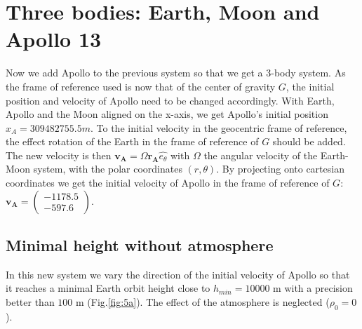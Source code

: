 \documentclass[a4paper,12pt,twoside]{article}
\begin{document}
\section{Three bodies: Earth, Moon and Apollo 13}
Now we add Apollo to the previous system so that we get a 3-body system. As the frame of reference used is now that of the center of gravity $G$, the initial position and velocity of Apollo need to be changed accordingly. With Earth, Apollo and the Moon aligned on the x-axis, we get Apollo's initial position $x_A = 309482755.5 m$. To the initial velocity in the geocentric frame of reference, the effect rotation of the Earth in the frame of reference of $G$ should be added. The new velocity is then $\mathbf{v_A}=\Omega \mathbf{r_A} \hat{e_{\theta}}$ with $\Omega$ the angular velocity of the Earth-Moon system, with the polar coordinates $(r,\theta)$. By projecting onto cartesian coordinates we get the initial velocity of Apollo in the frame of reference of $G$: $\mathbf{v_A}=\begin{pmatrix} \num{-1178.5} \\ \num{-597.6} \end{pmatrix}$.

\subsection{Minimal height without atmosphere}
In this new system we vary the direction of the initial velocity of Apollo so that it reaches a minimal Earth orbit height close to $h_{min} = 10000$ m with a precision better than $100$ m (Fig.\ref{fig:5a}). The effect of the atmosphere is neglected ($\rho_0 = 0$).
\end{document}
